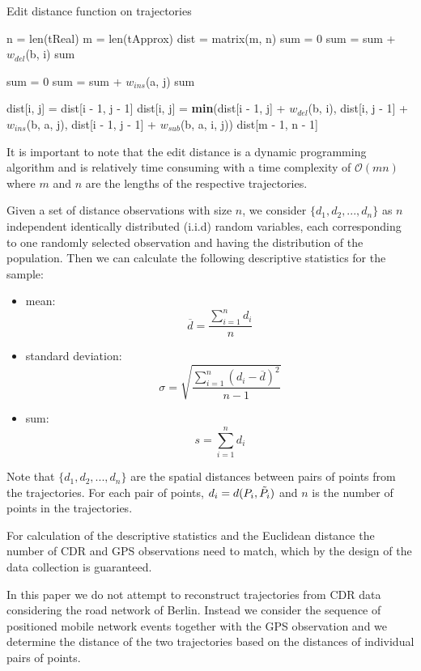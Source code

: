 \begin{algorithm}
\begin{algorithmic}
\caption{Edit distance function on trajectories} \label{algo:edit}
\State n = len(tReal)
\State m = len(tApprox) 
\State dist = matrix(m, n)
    \State sum = 0
        \State sum = sum + $w_{del}$(b, i)
    \EndFor
    \Return sum
\EndIf

    \State sum = 0
        \State sum = sum + $w_{ins}$(a, j)
    \EndFor
    \Return sum
\EndIf

                \State dist[i, j] = dist[i - 1, j - 1]
            \Else
                \State dist[i, j] = \textbf{min}(dist[i - 1, j] + $w_{del}$(b, i), dist[i, j - 1] + $w_{ins}$(b, a, j), dist[i - 1, j - 1] + $w_{sub}$(b, a, i, j))
            \EndIf
        \EndFor
    \EndFor
    \Return dist[m - 1, n - 1]
\EndIf
\EndFunction
\end{algorithmic}
\end{algorithm}

It is important to note that the edit distance is a dynamic programming algorithm and is relatively time consuming with a time complexity of $\mathcal{O}(mn)$ where $m$ and $n$ are the lengths of the respective trajectories.

Given a set of distance observations with size $n$, we consider $\{d_{1}, d_{2}, ..., d_{n}\}$ as $n$ independent identically distributed (i.i.d) random variables, each corresponding to one randomly selected observation and having the distribution of the population. Then we can calculate the following descriptive statistics for the sample:
\begin{itemize}
    \item mean:
     \[ \overline {d} = \frac{\sum_{i=1}^{n} d_{i}}{n}\]
     \item standard deviation:
    \[ \sigma={\sqrt {\frac {\sum _{i=1}^{n}(d_{i}-{\overline {d}})^{2}}{n-1}}}\]
    \item sum:        
    \[s = \sum_{i=1}^{n} d_{i}\]
\end{itemize}

Note that $\{d_{1}, d_{2}, ..., d_{n}\}$ are the spatial distances between pairs of points from the trajectories. For each pair of points, $d_{i} = d(P_{i},\Tilde{P_{i}})$ and $n$ is the number of points in the trajectories.

For calculation of the descriptive statistics and the Euclidean distance the number of CDR and GPS observations need to match, which by the design of the data collection is guaranteed.

In this paper we do not attempt to reconstruct trajectories from CDR data considering the road network of Berlin. Instead we consider the sequence of positioned mobile network events together with the GPS observation and we determine the distance of the two trajectories based on the distances of individual pairs of points.




